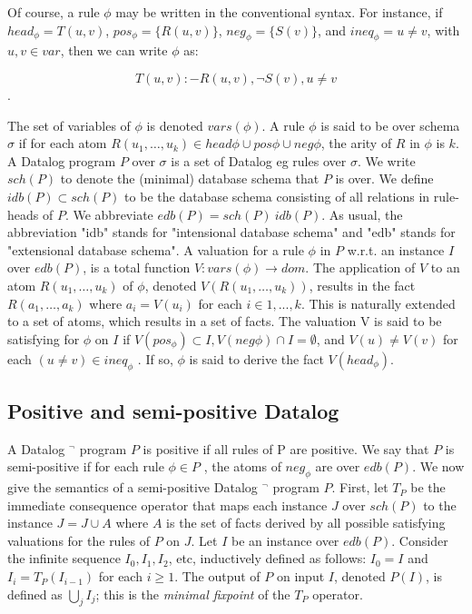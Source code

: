 \documentclass{pracamgr}
\theoremstyle{plain}
\theoremstyle{definition}
\theoremstyle{remark}
\begin{document}
Of course, a rule $\phi$ may be written in the conventional syntax. For instance, if $head_\phi = T(u, v)$, $pos_\phi = \{R(u, v)\}$, $
neg_\phi = \{S(v)\}$, and $ineq_\phi = {u \ne v}$, with $u, v \in var$,
then we can write $\phi$ as:

$$T (u, v) :- R(u, v), \neg S(v), u \ne v$$.

The set of variables of $\phi$ is denoted $vars(\phi)$. A rule $\phi$ is
said to be over schema $\sigma$ if for each atom $R(u_1 , \dots , u_k ) \in
{head \phi } \cup pos \phi \cup neg \phi$, the arity of $R$ in $\phi$ is $k$. A Datalog program $P$ over $\sigma$ is a set of Datalog 
eg rules over $\sigma$. We write
$sch(P)$ to denote the (minimal) database schema that $P$ is
over. We define $idb(P ) \subset sch(P )$ to be the database schema
consisting of all relations in rule-heads of $P$. We abbreviate
$edb(P ) = sch(P ) \ idb(P )$. As usual, the abbreviation "idb"
stands for "intensional database schema" and "edb" stands
for "extensional database schema". A valuation for a rule
$\phi$ in $P$ w.r.t. an instance $I$ over $edb(P)$, is a total function
$V : vars(\phi) \to dom$. The application of $V$ to an atom
$R(u_1 , \dots , u_k)$ of $\phi$, denoted $V(R(u_1 , \dots, u_k ))$, results in the
fact $R(a_1 ,\dots, a_k )$ where $a_i = V (u_i )$ for each $i \in {1, . . . , k}$.
This is naturally extended to a set of atoms, which results
in a set of facts. The valuation V is said to be satisfying for
$\phi$ on $I$ if $V (pos_\phi ) \subset I, V (neg \phi ) \cap I = \emptyset$, and $V (u) \ne V (v)$ for each $(u \ne v) \in ineq_\phi$ . If so, $\phi$ is said to derive the fact $V (head_\phi )$.


\subsection{Positive and semi-positive Datalog}

A Datalog $^\neg$ program $P$ is positive if all rules of P are positive. We say
that $P$ is semi-positive if for each rule $\phi \in P$ , the atoms
of $neg_\phi$ are over $edb(P )$. We now give the semantics of a
semi-positive Datalog $^\neg$ program $P$. First, let $T_P$ be the
immediate consequence operator that maps each instance $J$
over $sch(P )$ to the instance $J = J \cup A$ where $A$ is the set
of facts derived by all possible satisfying valuations for the
rules of $P$ on $J$. Let $I$ be an instance over $edb(P )$. Consider
the infinite sequence $I_0 , I_1 , I_2 $, etc, inductively defined as
follows: $I_0 = I$ and $I_i = T_P(I_{i-1})$ for each $i \ge 1$. The output of $P$ on input $I$, denoted $P(I)$, is defined as $\bigcup_j I_j$; this
is the \emph{minimal fixpoint} of the $T_P$ operator.
\end{document}
